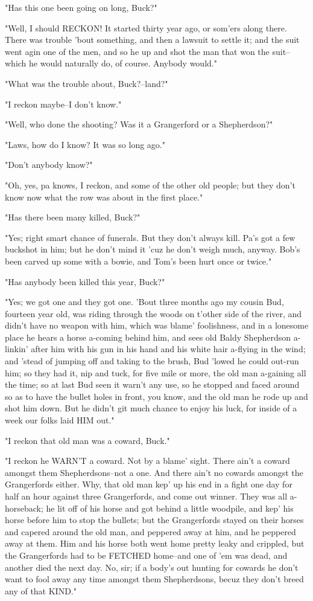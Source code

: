 "Has this one been going on long, Buck?"

"Well, I should RECKON!  It started thirty year ago, or som'ers along
there.  There was trouble 'bout something, and then a lawsuit to settle
it; and the suit went agin one of the men, and so he up and shot the man
that won the suit--which he would naturally do, of course.  Anybody
would."

"What was the trouble about, Buck?--land?"

"I reckon maybe--I don't know."

"Well, who done the shooting?  Was it a Grangerford or a Shepherdson?"

"Laws, how do I know?  It was so long ago."

"Don't anybody know?"

"Oh, yes, pa knows, I reckon, and some of the other old people; but they
don't know now what the row was about in the first place."

"Has there been many killed, Buck?"

"Yes; right smart chance of funerals.  But they don't always kill.  Pa's
got a few buckshot in him; but he don't mind it 'cuz he don't weigh much,
anyway.  Bob's been carved up some with a bowie, and Tom's been hurt once
or twice."

"Has anybody been killed this year, Buck?"

"Yes; we got one and they got one.  'Bout three months ago my cousin Bud,
fourteen year old, was riding through the woods on t'other side of the
river, and didn't have no weapon with him, which was blame' foolishness,
and in a lonesome place he hears a horse a-coming behind him, and sees
old Baldy Shepherdson a-linkin' after him with his gun in his hand and
his white hair a-flying in the wind; and 'stead of jumping off and taking
to the brush, Bud 'lowed he could out-run him; so they had it, nip and
tuck, for five mile or more, the old man a-gaining all the time; so at
last Bud seen it warn't any use, so he stopped and faced around so as to
have the bullet holes in front, you know, and the old man he rode up and
shot him down.  But he didn't git much chance to enjoy his luck, for
inside of a week our folks laid HIM out."

"I reckon that old man was a coward, Buck."

"I reckon he WARN'T a coward.  Not by a blame' sight.  There ain't a
coward amongst them Shepherdsons--not a one.  And there ain't no cowards
amongst the Grangerfords either.  Why, that old man kep' up his end in a
fight one day for half an hour against three Grangerfords, and come out
winner.  They was all a-horseback; he lit off of his horse and got behind
a little woodpile, and kep' his horse before him to stop the bullets; but
the Grangerfords stayed on their horses and capered around the old man,
and peppered away at him, and he peppered away at them.  Him and his
horse both went home pretty leaky and crippled, but the Grangerfords had
to be FETCHED home--and one of 'em was dead, and another died the next
day.  No, sir; if a body's out hunting for cowards he don't want to fool
away any time amongst them Shepherdsons, becuz they don't breed any of
that KIND."

